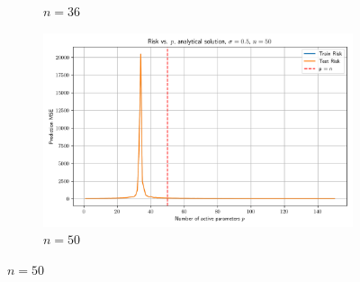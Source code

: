 \documentclass[twoside,10pt]{article}
\begin{document}
\begin{figure}[htb]
\begin{subfigure}[b]{\imgwidth}
    \caption{$n=36$}\label{fig:2c}
  \end{subfigure}%
  \hfill
  \begin{subfigure}[b]{\imgwidth}
    \includegraphics[width=\linewidth]{img2/risk_curve_n50.png}
    \caption{$n=50$}\label{fig:2d}
  \end{subfigure}

  \medskip


\end{figure}
\end{document}
